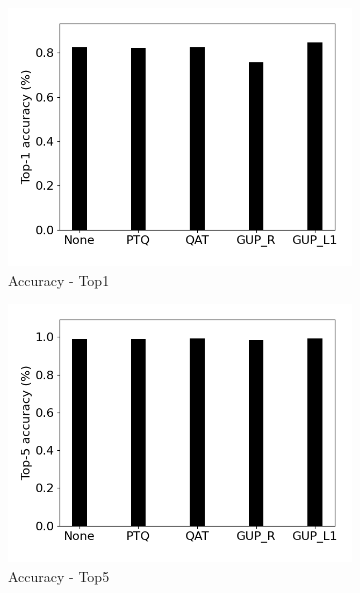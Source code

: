 \begin{figure}[]
    \centering
    \begin{subfigure}{0.19\textwidth}
        \includegraphics[width=1\textwidth]{other/figures/Resnet18_CIFAR10_Laptop/TOP1accuracy.png}
        \caption{Accuracy - Top1}
    \end{subfigure}
    \begin{subfigure}{0.19\textwidth}
        \includegraphics[width=1\textwidth]{other/figures/Resnet18_CIFAR10_Laptop/TOP5accuracy.png}
        \caption{Accuracy - Top5}
    \end{subfigure}
    \begin{subfigure}{0.19\textwidth}

\end{subfigure}
\end{figure}
